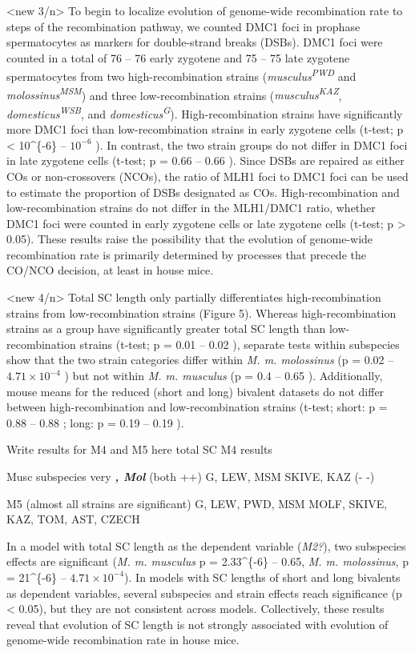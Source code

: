 \documentclass[
]{article}
\begin{document}
\textless new 3/n\textgreater{} To begin to localize evolution of
genome-wide recombination rate to steps of the recombination pathway, we
counted DMC1 foci in prophase spermatocytes as markers for double-strand
breaks (DSBs). DMC1 foci were counted in a total of 76 -- 76 early
zygotene and 75 -- 75 late zygotene spermatocytes from two
high-recombination strains (\emph{musculus\textsuperscript{PWD}} and
\emph{molossinus\textsuperscript{MSM}}) and three low-recombination
strains (\emph{musculus\textsuperscript{KAZ}},
\emph{domesticus\textsuperscript{WSB}}, and
\emph{domesticus\textsuperscript{G}}). High-recombination strains have
significantly more DMC1 foci than low-recombination strains in early
zygotene cells (t-test; p \textless{} 10\^{}\{-6\} --
\ensuremath{10^{-6}} ). In contrast, the two strain groups do not differ
in DMC1 foci in late zygotene cells (t-test; p = 0.66 -- 0.66 ). Since
DSBs are repaired as either COs or non-crossovers (NCOs), the ratio of
MLH1 foci to DMC1 foci can be used to estimate the proportion of DSBs
designated as COs. High-recombination and low-recombination strains do
not differ in the MLH1/DMC1 ratio, whether DMC1 foci were counted in
early zygotene cells or late zygotene cells (t-test; p \textgreater{}
0.05). These results raise the possibility that the evolution of
genome-wide recombination rate is primarily determined by processes that
precede the CO/NCO decision, at least in house mice.

\textless new 4/n\textgreater{} Total SC length only partially
differentiates high-recombination strains from low-recombination strains
(Figure 5). Whereas high-recombination strains as a group have
significantly greater total SC length than low-recombination strains
(t-test; p = 0.01 -- 0.02 ), separate tests within subspecies show that
the two strain categories differ within \emph{M. m. molossinus} (p =
0.02 -- \ensuremath{4.71\times 10^{-4}} ) but not within \emph{M. m.
musculus} (p = 0.4 -- 0.65 ). Additionally, mouse means for the reduced
(short and long) bivalent datasets do not differ between
high-recombination and low-recombination strains (t-test; short: p =
0.88 -- 0.88 ; long: p = 0.19 -- 0.19 ).

Write results for M4 and M5 here total SC M4 results

Musc subspecies very \textbf{\emph{, Mol }} (both ++) G, LEW, MSM SKIVE,
KAZ (- -)

M5 (almost all strains are significant) G, LEW, PWD, MSM MOLF, SKIVE,
KAZ, TOM, AST, CZECH

In a model with total SC length as the dependent variable (\emph{M2?}),
two subspecies effects are significant (\emph{M. m. musculus} p =
2.33\^{}\{-6\} -- 0.65, \emph{M. m. molossinus}, p = 21\^{}\{-6\} --
\ensuremath{4.71\times 10^{-4}}). In models with SC lengths of short and
long bivalents as dependent variables, several subspecies and strain
effects reach significance (p \textless{} 0.05), but they are not
consistent across models. Collectively, these results reveal that
evolution of SC length is not strongly associated with evolution of
genome-wide recombination rate in house mice.
\end{document}
